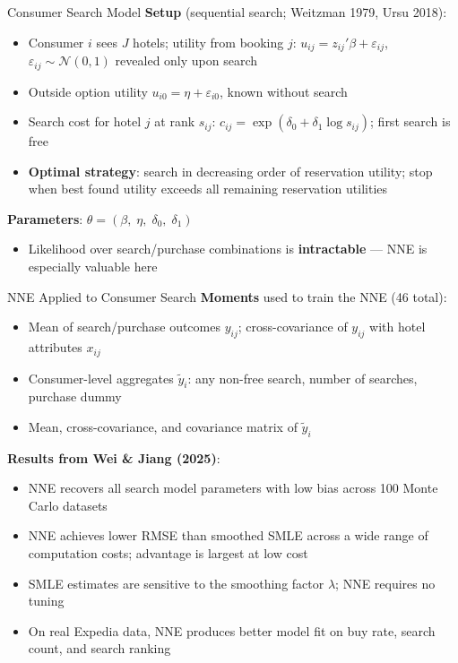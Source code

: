 \documentclass[aspectratio=169,professionalfonts]{beamer}
\newcommand{\hl}[1]{\textbf{\textcolor{UGARed}{#1}}}
\begin{document}
\begin{frame}{Consumer Search Model}
  \hl{Setup} (sequential search; Weitzman 1979, Ursu 2018):
  \begin{itemize}
    \item Consumer $i$ sees $J$ hotels; utility from booking $j$:
          $u_{ij} = z_{ij}'\beta + \varepsilon_{ij}$,\;
          $\varepsilon_{ij} \sim \mathcal{N}(0,1)$ revealed only upon search
    \item Outside option utility $u_{i0} = \eta + \varepsilon_{i0}$, known without search
    \item Search cost for hotel $j$ at rank $s_{ij}$:
          $c_{ij} = \exp(\delta_0 + \delta_1 \log s_{ij})$; first search is free
    \item \hl{Optimal strategy}: search in decreasing order of reservation utility;
          stop when best found utility exceeds all remaining reservation utilities
  \end{itemize}
  \medskip
  \hl{Parameters}: $\theta = (\beta,\; \eta,\; \delta_0,\; \delta_1)$
  \begin{itemize}
    \item Likelihood over search/purchase combinations is \textbf{intractable} ---
          NNE is especially valuable here
  \end{itemize}
\end{frame}

\begin{frame}{NNE Applied to Consumer Search}
  \hl{Moments} used to train the NNE (46 total):
  \begin{itemize}
    \item Mean of search/purchase outcomes $y_{ij}$; cross-covariance of $y_{ij}$ with hotel attributes $x_{ij}$
    \item Consumer-level aggregates $\tilde{y}_i$: any non-free search, number of searches, purchase dummy
    \item Mean, cross-covariance, and covariance matrix of $\tilde{y}_i$
  \end{itemize}
  \medskip
  \hl{Results from Wei \& Jiang (2025)}:
  \begin{itemize}
    \item NNE recovers all search model parameters with low bias across 100 Monte Carlo datasets
    \item NNE achieves lower RMSE than smoothed SMLE across a wide range of computation costs;
          advantage is largest at low cost
    \item SMLE estimates are sensitive to the smoothing factor $\lambda$; NNE requires no tuning
    \item On real Expedia data, NNE produces better model fit on buy rate, search count, and search ranking
  \end{itemize}
\end{frame}
\end{document}
